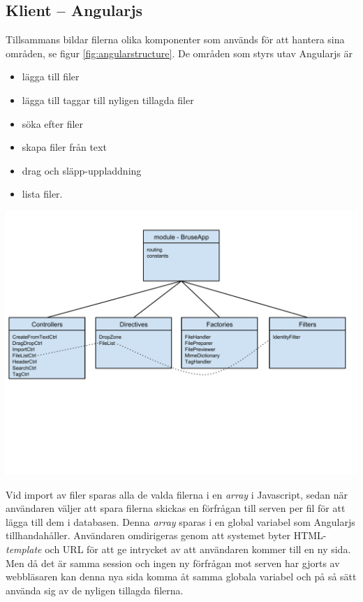 \subsection{Klient – Angularjs}

Tillsammans bildar filerna olika komponenter som används för att hantera sina områden, se figur \ref{fig:angularstructure}. De områden som styrs utav Angularjs är

\begin{itemize}
  \item lägga till filer
  \item lägga till taggar till nyligen tillagda filer
  \item söka efter filer
  \item skapa filer från text
  \item drag och släpp-uppladdning
  \item lista filer.
\end{itemize}

\begin{Figure}
  \centering
    \includegraphics[width=0.9\linewidth]{figures/angularstructure.pdf}
\end{Figure}

Vid import av filer sparas alla de valda filerna i en \emph{array} i
Javascript, sedan när användaren väljer att spara filerna skickas en förfrågan
till serven per fil för att lägga till dem i databasen. Denna \emph{array}
sparas i en global variabel som Angularjs tillhandahåller. Användaren
omdirigeras genom att systemet byter HTML-\emph{template} och URL för att ge
intrycket av att användaren kommer till en ny sida. Men då det är samma session
och ingen ny förfrågan mot serven har gjorts av webbläsaren kan denna nya sida
komma åt samma globala variabel och på så sätt använda sig av de nyligen
tillagda filerna.


